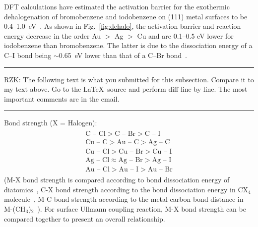 \documentclass[%
 reprint,
 amsmath,amssymb,
 aps,
prb,
]{revtex4-2}
\begin{document}
DFT calculations have estimated the activation barrier for the exothermic dehalogenation of bromobenzene and iodobenzene on (111) metal surfaces to be 0.4--1.0~eV~\cite{jacs2013}. As shown in Fig.~\ref{fig:dehalo}, the activation barrier and reaction energy decrease in the order Au $>$ Ag $>$ Cu and are 0.1--0.5 eV lower for iodobenzene than bromobenzene. The latter is due to the dissociation energy of a C--I bond being $\sim$0.65~eV lower than that of a C--Br bond~\cite{Arpc1982}.

\rule{\columnwidth}{0.4pt}

RZK: The following text is what you submitted for this subsection. Compare it to my text above. Go to the \LaTeX\ source and perform diff line by line. The most important comments are in the email.

\rule{\columnwidth}{0.4pt}

Bond strength (X = Halogen):
%
\begin{eqnarray}
\begin{split}
\text{C -- Cl} > \text{C -- Br} > \text{C -- I} \\ 
\text{Cu -- C} > \text{Au -- C} > \text{Ag -- C} \\
\text{Cu -- Cl} > \text{Cu -- Br} > \text{Cu -- I}\\
\text{Ag -- Cl} \approx \text{Ag -- Br} > \text{Ag -- I} \\
\text{Au -- Cl} > \text{Au -- I} > \text{Au -- Br}
\end{split}
\end{eqnarray}
(M-X bond strength is compared according to bond dissociation energy of diatomics~\cite{ullmann_62}, C-X bond strength according to the bond dissociation energy in CX$_4$ molecule~\cite{ullmann_63}, M-C bond strength according to the metal-carbon bond distance in M-(CH$_3$)$_2$~\cite{ullmann_61}).
For surface Ullmann coupling reaction, M-X bond strength can be compared together to present an overall relationship.
\end{document}

